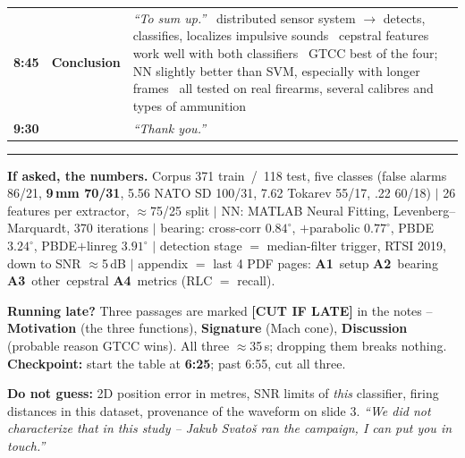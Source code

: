 \documentclass[10pt,a4paper]{article}
\newcommand{\say}[1]{\textit{\color{black!75}``#1''}}
\newcommand{\bt}{\newline\raisebox{0.15ex}{\tiny$\blacksquare$}~}
\newcommand{\cue}[3]{%
  \textbf{\color{ctublue}#1} & \textbf{#2} & #3 \\[1.5ex]}
\begin{document}
{\begin{tabular}{@{}>{\raggedright\arraybackslash}p{10mm} >{\raggedright\arraybackslash}p{19mm} >{\raggedright\arraybackslash}p{147mm}@{}}
\cue{8:45}{Conclusion}{%
  \say{To sum up.}
  \bt distributed sensor system $\to$ detects, classifies, localizes impulsive sounds
  \bt cepstral features work well with both classifiers
  \bt GTCC best of the four; NN slightly better than SVM, especially with longer frames
  \bt all tested on real firearms, several calibres and types of ammunition}

\cue{9:30}{}{\say{Thank you.}}

\end{tabular}
}

\vspace{-1mm}\hrule\vspace{1.5mm}

{\footnotesize
\textbf{\color{accent}If asked, the numbers.}
Corpus 371 train \,/\, 118 test, five classes (false alarms 86/21, \textbf{9\,mm 70/31},
5.56 NATO SD 100/31, 7.62 Tokarev 55/17, .22 60/18) $|$ 26 features per extractor,
$\approx$75/25 split $|$ NN: MATLAB Neural Fitting, Levenberg--Marquardt, 370 iterations $|$
bearing: cross-corr $0.84^\circ$, $+$parabolic $\mathbf{0.77^\circ}$, PBDE $3.24^\circ$,
PBDE$+$linreg $3.91^\circ$ $|$ detection stage $=$ median-filter trigger, RTSI 2019, down to
SNR $\approx$5\,dB $|$ appendix $=$ last 4 PDF pages: \textbf{A1}~setup \textbf{A2}~bearing
\textbf{A3}~other~cepstral \textbf{A4}~metrics (RLC $=$ recall).
\par\vspace{1mm}
\textbf{\color{accent}Running late?} Three passages are marked \textbf{[CUT IF LATE]} in the
notes -- \textbf{Motivation} (the three functions), \textbf{Signature} (Mach cone),
\textbf{Discussion} (probable reason GTCC wins). All three $\approx$35\,s; dropping them
breaks nothing. \textbf{Checkpoint:} start the table at \textbf{6:25}; past 6:55, cut all three.
\par\vspace{1mm}
\textbf{\color{accent}Do not guess:} 2D position error in metres, SNR limits of \emph{this}
classifier, firing distances in this dataset, provenance of the waveform on slide 3.
\say{We did not characterize that in this study -- Jakub Svatoš ran the campaign, I can
put you in touch.}}
\end{document}
